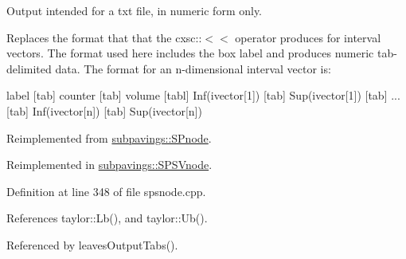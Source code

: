 \-Output intended for a txt file, in numeric form only.

\-Replaces the format that that the cxsc\-:\-:$<$$<$ operator produces for interval vectors. \-The format used here includes the box label and produces numeric tab-\/delimited data. \-The format for an n-\/dimensional interval vector is\-:

label \mbox{[}tab\mbox{]} counter \mbox{[}tab\mbox{]} volume \mbox{[}tabl\mbox{]} \-Inf(ivector\mbox{[}1\mbox{]}) \mbox{[}tab\mbox{]} \-Sup(ivector\mbox{[}1\mbox{]}) \mbox{[}tab\mbox{]} ... \mbox{[}tab\mbox{]} \-Inf(ivector\mbox{[}n\mbox{]}) \mbox{[}tab\mbox{]} \-Sup(ivector\mbox{[}n\mbox{]}) 

\-Reimplemented from \hyperlink{classsubpavings_1_1SPnode_a0f2381175b37224a185eedbe9601d814}{subpavings\-::\-S\-Pnode}.



\-Reimplemented in \hyperlink{classsubpavings_1_1SPSVnode_a01b35db8ce4b99460ff352f6d25a529c}{subpavings\-::\-S\-P\-S\-Vnode}.



\-Definition at line 348 of file spsnode.\-cpp.



\-References taylor\-::\-Lb(), and taylor\-::\-Ub().



\-Referenced by leaves\-Output\-Tabs().



